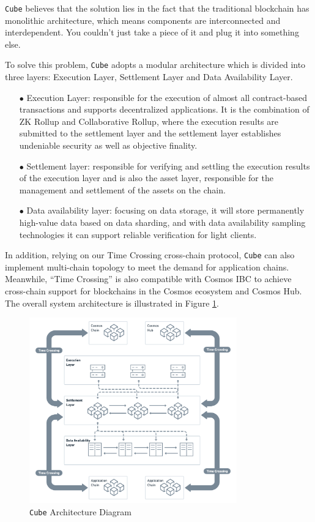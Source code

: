 \documentclass{iacrtrans}
\begin{document}
\texttt{Cube} believes that the solution lies in the fact that the traditional blockchain has monolithic architecture, which means components are interconnected and interdependent. You couldn't just take a piece of it and plug it into something else. 

To solve this problem, \texttt{Cube} adopts a modular architecture which is divided into three layers: Execution Layer, Settlement Layer and Data Availability Layer.

\begin{itemize}
	\item[$\bullet$] Execution Layer: responsible for the execution of almost all contract-based transactions and supports decentralized applications. It is the combination of ZK Rollup and Collaborative Rollup, where the execution results are submitted to the settlement layer and the settlement layer establishes undeniable security as well as objective finality. 
	\item[$\bullet$] Settlement layer: responsible for verifying and settling the execution results of the execution layer and is also the asset layer, responsible for the management and settlement of the assets on the chain.
	\item[$\bullet$] Data availability layer: focusing on data storage, it will store permanently high-value data based on data sharding, and with data availability sampling technologies it can support reliable verification for light clients.
\end{itemize}

In addition, relying on our Time Crossing cross-chain protocol, \texttt{Cube} can also implement multi-chain topology to meet the demand for application chains. Meanwhile, “Time Crossing” is also compatible with Cosmos IBC to achieve cross-chain support for blockchains in the Cosmos ecosystem and Cosmos Hub. The overall system architecture is illustrated in Figure \ref{fig:1}.

\begin{figure}[h]
	\centering
	\includegraphics[width=0.8\textwidth]{images/1.png}
	\caption{\texttt{Cube} Architecture Diagram}
	\label{fig:1} 
\end{figure}
\end{document}
